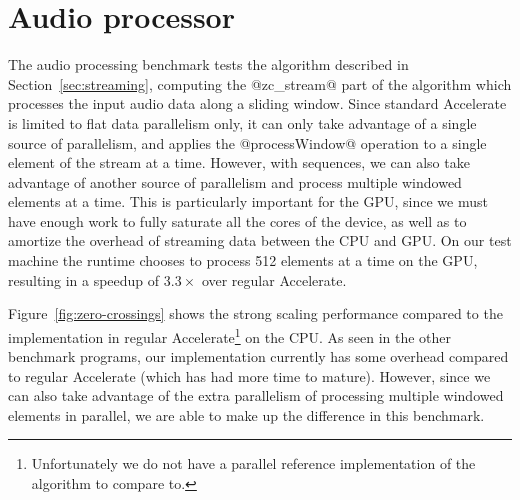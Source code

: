 \section{Audio processor}

The audio processing benchmark tests the algorithm described in
Section~\ref{sec:streaming}, computing the @zc_stream@ part of the algorithm
which processes the input audio data along a sliding window. Since standard
Accelerate is limited to flat data parallelism only, it
can only take advantage of a single source of parallelism, and applies the
@processWindow@ operation to a single element of the stream at a time.
However, with sequences, we can also take advantage of another source of
parallelism and process multiple windowed elements at a time.
This is particularly important for the GPU, since we must have enough work to
fully saturate all the cores of the device, as well as to amortize the overhead
of streaming data between the CPU and GPU\@. On our test machine the runtime
chooses to process 512 elements at a time on the GPU, resulting in a speedup of
$3.3\times$ over regular Accelerate.

Figure~\ref{fig:zero-crossings} shows the strong scaling performance compared to
the implementation in regular Accelerate\footnote{Unfortunately we do not have a
parallel reference implementation of the algorithm to compare to.} on the CPU\@.
As seen in the other benchmark programs, our implementation currently has some
overhead compared to regular Accelerate (which has had more time to mature).
However, since we can also take advantage of the extra parallelism of processing
multiple windowed elements in parallel, we are able to make up the difference in
this benchmark.



